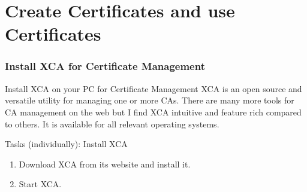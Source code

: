 \part{Create Certificates and use Certificates}

\nosectionpage
\section{Install XCA for Certificate Management}
\withsectionpage

\begin{frame}{Install \alert{XCA} on your PC for Certificate Management}
  \alert{XCA} is an \alert{open source} and \alert{versatile} utility for \alert{managing} one or more \alert{CA}s. There are \alert{many more tools} for CA management \alert{on the web} but I find \alert{XCA intuitive} and \alert{feature} rich compared to others. It is available for \alert{all relevant operating systems}.
\begin{exampleblock}{Tasks (individually): Install XCA}
  \begin{enumerate}
    \item \alert{Download} XCA from its website \href{https://hohnstaedt.de/xca/}{} and \alert{install} it.
    \item \alert{Start} XCA.
  \end{enumerate}
  \end{exampleblock}
\end{frame}
